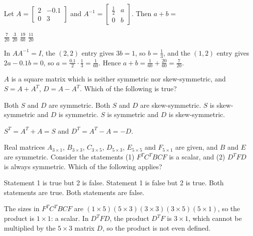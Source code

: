 \begin{question}[id=gate-ec2005-1, source=GATE EC 2005, marks=2]
Let $A = \begin{bmatrix} 2 & -0.1 \\ 0 & 3 \end{bmatrix}$ and $A^{-1} = \begin{bmatrix} \frac{1}{2} & a \\ 0 & b \end{bmatrix}$. Then $a + b =$
\begin{options}
  \correct $\frac{7}{20}$
  \option $\frac{3}{20}$
  \option $\frac{19}{60}$
  \option $\frac{11}{20}$
\end{options}
\begin{solution}
In $AA^{-1} = I$, the $(2, 2)$ entry gives $3b = 1$, so $b = \frac{1}{3}$, and the $(1, 2)$ entry gives $2a - 0.1b = 0$, so $a = \frac{0.1}{2} \cdot \frac{1}{3} = \frac{1}{60}$. Hence $a + b = \frac{1}{60} + \frac{20}{60} = \frac{7}{20}$.
\end{solution}
\end{question}

\begin{question}[id=gate-ce2011-1, source=GATE CE 2011]
$A$ is a square matrix which is neither symmetric nor skew-symmetric, and $S = A + A^T$, $D = A - A^T$. Which of the following is true?
\begin{options}
  \option Both $S$ and $D$ are symmetric.
  \option Both $S$ and $D$ are skew-symmetric.
  \option $S$ is skew-symmetric and $D$ is symmetric.
  \correct $S$ is symmetric and $D$ is skew-symmetric.
\end{options}
\begin{solution}
$S^T = A^T + A = S$ and $D^T = A^T - A = -D$.
\end{solution}
\end{question}

\begin{question}[id=gate-ce2004-1, source=GATE CE 2004, marks=2]
Real matrices $A_{3 \times 1}$, $B_{3 \times 3}$, $C_{3 \times 5}$, $D_{5 \times 3}$, $E_{5 \times 5}$ and $F_{5 \times 1}$ are given, and $B$ and $E$ are symmetric. Consider the statements (1) $F^TC^TBCF$ is a scalar, and (2) $D^TFD$ is always symmetric. Which of the following applies?
\begin{options}
  \correct Statement 1 is true but 2 is false.
  \option Statement 1 is false but 2 is true.
  \option Both statements are true.
  \option Both statements are false.
\end{options}
\begin{solution}
The sizes in $F^TC^TBCF$ are $(1 \times 5)(5 \times 3)(3 \times 3)(3 \times 5)(5 \times 1)$, so the product is $1 \times 1$: a scalar. In $D^TFD$, the product $D^TF$ is $3 \times 1$, which cannot be multiplied by the $5 \times 3$ matrix $D$, so the product is not even defined.
\end{solution}
\end{question}

